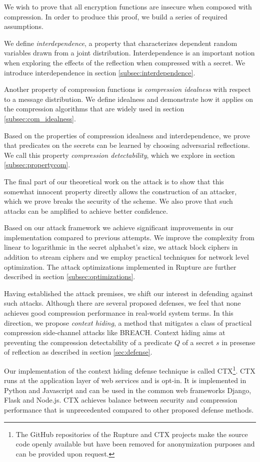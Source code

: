 We wish to prove that all encryption functions are insecure when composed with
compression. In order to produce this proof, we build a series of required
assumptions.

We define \textit{interdependence}, a property that characterizes dependent
random variables drawn from a joint distribution. Interdependence is an
important notion when exploring the effects of the reflection when compressed
with a secret. We introduce interdependence in section
\ref{subsec:interdependence}.

Another property of compression functions is \textit{compression idealness} with
respect to a message distribution. We define idealness and demonstrate how it
applies on the compression algorithms that are widely used in section
\ref{subsec:com_idealness}.

Based on the properties of compression idealness and interdependence, we prove
that predicates on the secrets can be learned by choosing adversarial
reflections. We call this property \textit{compression detectability}, which we
explore in section \ref{subsec:propertycom}.

The final part of our theoretical work on the attack is to show that this
somewhat innocent property directly allows the construction of an attacker,
which we prove breaks the security of the scheme. We also prove that such
attacks can be amplified to achieve better confidence.

Based on our attack framework we achieve significant improvements in our
implementation compared to previous attempts. We improve the complexity from
linear to logarithmic in the secret alphabet's size, we attack block ciphers in
addition to stream ciphers and we employ practical techniques for network level
optimization. The attack optimizations implemented in Rupture are further
described in section \ref{subsec:optimizations}.

Having established the attack premises, we shift our interest in defending
against such attacks. Although there are several proposed defenses, we feel that
none achieves good compression performance in real-world system terms. In this
direction, we propose \textit{context hiding}, a method that mitigates a class
of practical compression side-channel attacks like BREACH. Context hiding aims
at preventing the compression detectability of a predicate $Q$ of a secret $s$
in presense of reflection as described in section \ref{sec:defense}.

Our implementation of the context hiding defense technique is called
CTX\footnote[1]{The GitHub repositories of the Rupture and CTX projects make the
source code openly available but have been removed for anonymization purposes
and can be provided upon request.}. CTX runs at the application layer of web
services and is opt-in. It is implemented in Python and Javascript and can be
used in the common web frameworks Django, Flask and Node.js. CTX achieves
balance between security and compression performance that is unprecedented
compared to other proposed defense methods.

